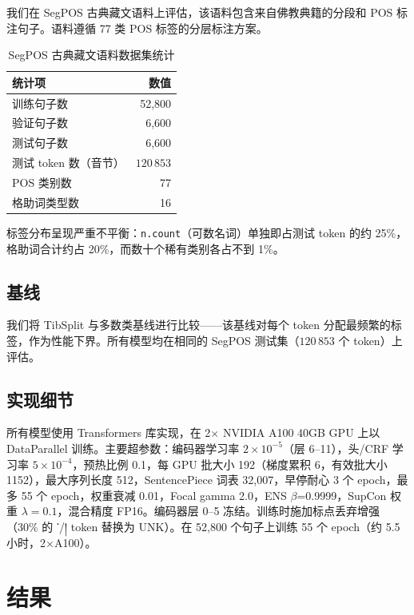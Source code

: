 \documentclass[11pt,a4paper]{article}
\DeclareRobustCommand\tib[1]{{\tibetan #1}}
\begin{document}
我们在 SegPOS 古典藏文语料上评估，该语料包含来自佛教典籍的分段和 POS 标注句子。语料遵循 77 类 POS 标签的分层标注方案。

\begin{table}[h]
\centering
\caption{SegPOS 古典藏文语料数据集统计}
\label{tab:dataset}
\begin{tabular}{lr}
\toprule
统计项                      & 数值             \\
\midrule
训练句子数                   & 52,800          \\
验证句子数                   & 6,600           \\
测试句子数                   & 6,600           \\
测试 token 数（音节）         & $120\,853$        \\
POS 类别数                   & 77              \\
格助词类型数                 & 16             \\
\bottomrule
\end{tabular}
\end{table}

标签分布呈现严重不平衡：\texttt{n.count}（可数名词）单独即占测试 token 的约 25\%，格助词合计约占 20\%，而数十个稀有类别各占不到 1\%。

\subsection{基线}

我们将 TibSplit 与多数类基线进行比较——该基线对每个 token 分配最频繁的标签，作为性能下界。所有模型均在相同的 SegPOS 测试集（$120\,853$ 个 token）上评估。

\subsection{实现细节}

所有模型使用 Transformers 库实现，在 2× NVIDIA A100 40GB GPU 上以 DataParallel 训练。主要超参数：编码器学习率 $2 \times 10^{-5}$（层 6--11），头/CRF 学习率 $5 \times 10^{-4}$，预热比例 0.1，每 GPU 批大小 192（梯度累积 6，有效批大小 1152），最大序列长度 512，SentencePiece 词表 32,007，早停耐心 3 个 epoch，最多 55 个 epoch，权重衰减 0.01，Focal gamma 2.0，ENS $\beta$=0.9999，SupCon 权重 $\lambda=0.1$，混合精度 FP16。编码器层 0--5 冻结。训练时施加标点丢弃增强（30\% 的 \tib{་}/\tib{།} token 替换为 UNK）。在 52,800 个句子上训练 55 个 epoch（约 5.5 小时，2×A100）。

\section{结果}
\end{document}
